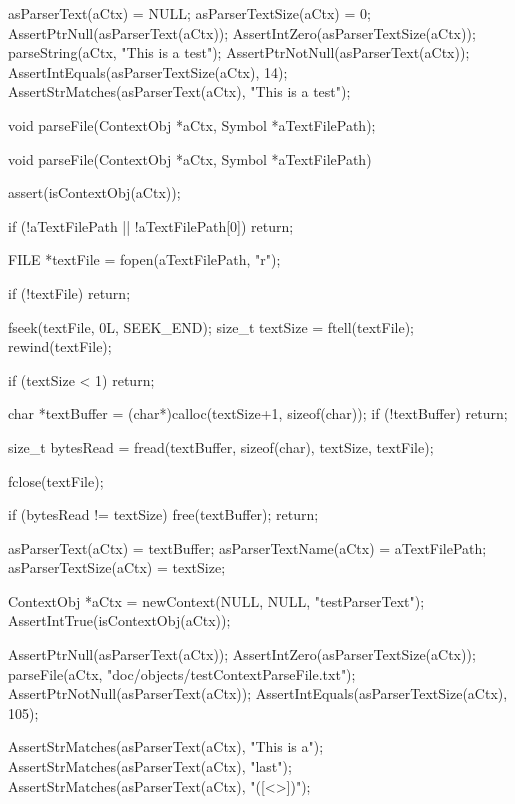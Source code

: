   asParserText(aCtx)     = NULL;
  asParserTextSize(aCtx) = 0;
  AssertPtrNull(asParserText(aCtx));
  AssertIntZero(asParserTextSize(aCtx));
  parseString(aCtx, "This is a test");
  AssertPtrNotNull(asParserText(aCtx));
  AssertIntEquals(asParserTextSize(aCtx), 14);
  AssertStrMatches(asParserText(aCtx), "This is a test");
\stopCTest
\stopTestCase
\stopTestSuite

\startTestSuite[parseFile]

\startCHeader
void parseFile(ContextObj *aCtx, Symbol *aTextFilePath);
\stopCHeader

\startCCode
void parseFile(ContextObj *aCtx, Symbol *aTextFilePath) {
  assert(isContextObj(aCtx));
  
  if (!aTextFilePath || !aTextFilePath[0]) return;
  
  FILE *textFile = fopen(aTextFilePath, "r");
  
  if (!textFile) return;
  
  fseek(textFile, 0L, SEEK_END);
  size_t textSize = ftell(textFile);
  rewind(textFile);
  
  if (textSize < 1) return;
  
  char *textBuffer = (char*)calloc(textSize+1, sizeof(char));
  if (!textBuffer) return;
  
  size_t bytesRead = fread(textBuffer, sizeof(char), textSize, textFile);

  fclose(textFile);
  
  if (bytesRead != textSize) {
    free(textBuffer);
    return;
  }

  asParserText(aCtx)     = textBuffer;
  asParserTextName(aCtx) = aTextFilePath;
  asParserTextSize(aCtx) = textSize;
}
\stopCCode


\startCTest
  ContextObj *aCtx = newContext(NULL, NULL, "testParserText");
  AssertIntTrue(isContextObj(aCtx));
  
  AssertPtrNull(asParserText(aCtx));
  AssertIntZero(asParserTextSize(aCtx));
  parseFile(aCtx, "doc/objects/testContextParseFile.txt");
  AssertPtrNotNull(asParserText(aCtx));
  AssertIntEquals(asParserTextSize(aCtx), 105);
  
  AssertStrMatches(asParserText(aCtx), "This is a");
  AssertStrMatches(asParserText(aCtx), "last");
  AssertStrMatches(asParserText(aCtx), "([<{}>])");
\stopCTest
\stopTestCase
\stopTestSuite

\startTestSuite[initializeRenderer]

